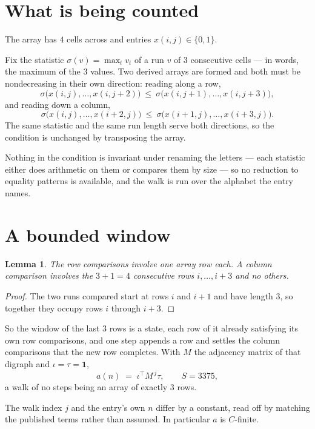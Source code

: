 \documentclass[11pt,a4paper]{article}
\theoremstyle{plain}
\newtheorem{lemma}[theorem]{Lemma}
\theoremstyle{definition}
\begin{document}
\section{What is being counted}

The array has $4$ cells across and entries $x(i,j)\in\{0,1\}$.

Fix the statistic $\sigma(v)=\max_t v_t$ of a run $v$ of $3$ consecutive cells --- in words,
the maximum of the $3$ values. Two derived arrays are formed and both must be
nondecreasing in their own direction: reading along a row,
\[
\sigma\bigl(x(i,j),\dots,x(i,j{+}2)\bigr)\ \le\
\sigma\bigl(x(i,j{+}1),\dots,x(i,j{+}3)\bigr),
\]
and reading down a column,
\[
\sigma\bigl(x(i,j),\dots,x(i{+}2,j)\bigr)\ \le\
\sigma\bigl(x(i{+}1,j),\dots,x(i{+}3,j)\bigr).
\]
The same statistic and the same run length serve both directions, so the condition is
unchanged by transposing the array.

Nothing in the condition is invariant under renaming the letters --- each statistic either does
arithmetic on them or compares them by size --- so no reduction to equality patterns is
available, and the walk is run over the alphabet the entry names.

\section{A bounded window}

\begin{lemma}\label{lem:win}
The row comparisons involve one array row each. A column comparison involves the
$3+1=4$ consecutive rows $i,\dots,i{+}3$ and no others.
\end{lemma}

\begin{proof}
The two runs compared start at rows $i$ and $i+1$ and have length $3$, so together they
occupy rows $i$ through $i+3$.
\end{proof}

So the window of the last $3$ rows is a state, each row of it already satisfying its own row
comparisons, and one step appends a row and settles the column comparisons that the new row
completes. With $M$ the adjacency matrix of that digraph and $\iota=\tau=\mathbf{1}$,
\[
a(n)\;=\;\iota^{\!\top}M^{\,j}\tau ,\qquad S=3375,
\]
a walk of no steps being an array of exactly $3$ rows.

The walk index $j$ and the entry's own $n$ differ by a constant, read off by matching the
published terms rather than assumed. In particular $a$ is $C$-finite.
\end{document}
